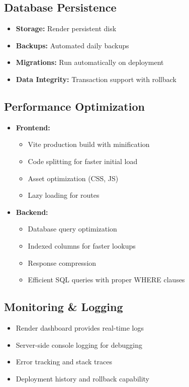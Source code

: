 \documentclass[12pt,a4paper]{article}
\begin{document}
\subsection{Database Persistence}

\begin{itemize}[leftmargin=*]
    \item \textbf{Storage:} Render persistent disk
    \item \textbf{Backups:} Automated daily backups
    \item \textbf{Migrations:} Run automatically on deployment
    \item \textbf{Data Integrity:} Transaction support with rollback
\end{itemize}

\subsection{Performance Optimization}

\begin{itemize}[leftmargin=*]
    \item \textbf{Frontend:}
    \begin{itemize}
        \item Vite production build with minification
        \item Code splitting for faster initial load
        \item Asset optimization (CSS, JS)
        \item Lazy loading for routes
    \end{itemize}
    
    \item \textbf{Backend:}
    \begin{itemize}
        \item Database query optimization
        \item Indexed columns for faster lookups
        \item Response compression
        \item Efficient SQL queries with proper WHERE clauses
    \end{itemize}
\end{itemize}

\subsection{Monitoring \& Logging}

\begin{itemize}[leftmargin=*]
    \item Render dashboard provides real-time logs
    \item Server-side console logging for debugging
    \item Error tracking and stack traces
    \item Deployment history and rollback capability
\end{itemize}
\end{document}
